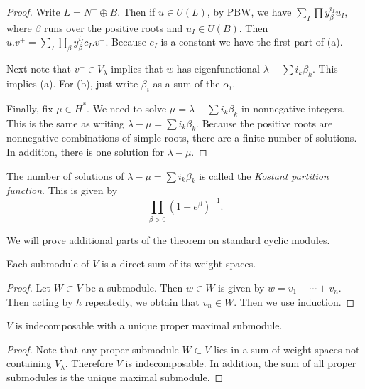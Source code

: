 \documentclass[twoside, 10pt]{article}
\begin{document}
    \begin{proof} Write $L = N^- \oplus B$. Then if $u \in U(L)$, by PBW, we
        have $\sum_I \prod y_{\beta}^{i_I} u_I$, where $\beta$ runs over the
        positive roots and $u_I \in U(B)$. Then $u.v^+ = \sum_I \prod_{\beta}
        y_{\beta}^{i_I} c_I.v^+$. Because $c_I$ is a constant we have the first
        part of (a).

        Next note that $v^+ \in V_{\lambda}$ implies that $w$ has
        eigenfunctional $\lambda - \sum i_k \beta_k$. This implies (a). For
        (b), just write $\beta_i$ as a sum of the $\alpha_i$.

        Finally, fix $\mu \in H^*$. We need to solve $\mu = \lambda - \sum i_k
    \beta_k$ in nonnegative integers. This is the same as writing $\lambda -
\mu = \sum i_k \beta_k$. Because the positive roots are nonnegative
combinations of simple roots, there are a finite number of solutions. In
addition, there is one solution for $\lambda - \mu$.  \end{proof}

    \begin{rmk} The number of solutions of $\lambda - \mu = \sum i_k \beta_k$
        is called the \textit{Kostant partition function}. This is given by \[
        \prod_{\beta > 0} (1-e^{\beta})^{-1}.\] \end{rmk}

    We will prove additional parts of the theorem on standard cyclic modules.
    \begin{prop} Each submodule of $V$ is a direct sum of its weight spaces.
    \end{prop}

    \begin{proof} Let $W \subset V$ be a submodule. Then $w \in W$ is given by
    $w = v_1 + \cdots + v_n$. Then acting by $h$ repeatedly, we obtain that
$v_n \in W$. Then we use induction.  \end{proof}

    \begin{prop} $V$ is indecomposable with a unique proper maximal submodule.
    \end{prop}

    \begin{proof} Note that any proper submodule $W \subset V$ lies in a sum of
    weight spaces not containing $V_{\lambda}$. Therefore $V$ is
indecomposable. In addition, the sum of all proper submodules is the unique
maximal submodule.  \end{proof}
\end{document}

